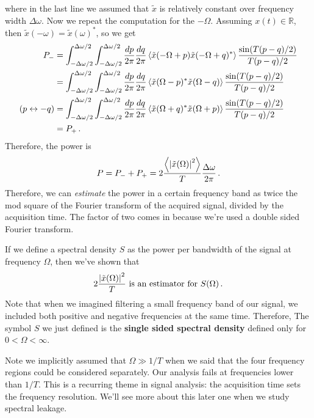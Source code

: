 \documentclass{article}
\begin{document}
where in the last line we assumed that $\tilde{x}$ is relatively constant over frequency width $\Delta \omega$.
Now we repeat the computation for the $-\Omega$.
Assuming $x(t) \in \mathbb{R}$, then $\tilde{x}(-\omega) = \tilde{x}(\omega)^*$, so we get
\begin{align*}
  P_- &=
  \int_{-\Delta \omega/2}^{\Delta\omega/2}
  \int_{-\Delta \omega/2}^{\Delta\omega/2}
  \frac{dp}{2\pi} \frac{dq}{2\pi}
  \left \langle \tilde{x}(-\Omega+p)\tilde{x}(-\Omega+q)^* \right \rangle \frac{\sin(T(p-q)/2)}{T(p-q)/2} \\
  &= \int_{-\Delta \omega/2}^{\Delta\omega/2}
  \int_{-\Delta \omega/2}^{\Delta\omega/2}
  \frac{dp}{2\pi} \frac{dq}{2\pi}
  \left \langle \tilde{x}(\Omega-p)^* \tilde{x}(\Omega-q) \right \rangle \frac{\sin(T(p-q)/2)}{T(p-q)/2} \\
  (p \leftrightarrow -q) &= \int_{-\Delta \omega/2}^{\Delta\omega/2}
  \int_{-\Delta \omega/2}^{\Delta\omega/2}
  \frac{dp}{2\pi} \frac{dq}{2\pi}
  \left \langle \tilde{x}(\Omega+q)^* \tilde{x}(\Omega+p) \right \rangle \frac{\sin(T(p-q)/2)}{T(p-q)/2} \\
  &= P_+ \, .
\end{align*}
Therefore, the power is
\begin{equation}
P = P_- + P_+ = 2 \frac{\left \langle \left \lvert \tilde{x}(\Omega) \right \rvert^2 \right \rangle}{T} \frac{\Delta \omega}{2\pi} \, .
\end{equation}
Therefore, we can \emph{estimate} the power in a certain frequency band as twice the mod square of the Fourier transform of the acquired signal, divided by the acquisition time.
The factor of two comes in because we're used a double sided Fourier transform.

If we define a spectral density $S$ as the power per bandwidth of the signal at frequency $\Omega$, then we've shown that
\begin{equation}
2 \frac{\left \lvert \tilde{x}(\Omega) \right \rvert^2}{T} \text{ is an estimator for } S(\Omega) \, .
\end{equation}
Note that when we imagined filtering a small frequency band of our signal, we included both positive and negative frequencies at the same time.
Therefore, The symbol $S$ we just defined is the \textbf{single sided spectral density} defined only for $0 < \Omega < \infty$.

Note we implicitly assumed that $\Omega \gg 1/T$ when we said that the four frequency regions could be considered separately.
Our analysis fails at frequencies lower than $1/T$.
This is a recurring theme in signal analysis: the acquisition time sets the frequency resolution.
We'll see more about this later one when we study spectral leakage.
\end{document}
